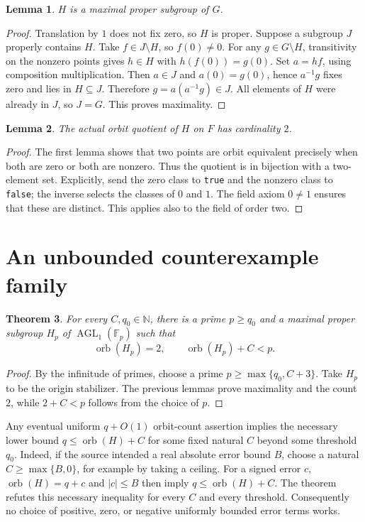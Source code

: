\documentclass[11pt]{article}
\newtheorem{theorem}{Theorem}
\newtheorem{lemma}[theorem]{Lemma}
\newcommand{\AGL}{\operatorname{AGL}}
\newcommand{\orb}{\operatorname{orb}}
\begin{document}
\begin{lemma}
$H$ is a maximal proper subgroup of $G$.
\end{lemma}
\begin{proof}
Translation by $1$ does not fix zero, so $H$ is proper. Suppose a subgroup
$J$ properly contains $H$. Take $f\in J\setminus H$, so $f(0)\ne0$. For any
$g\in G\setminus H$, transitivity on the nonzero points gives $h\in H$ with
$h(f(0))=g(0)$. Set $a=hf$, using composition multiplication. Then $a\in J$
and $a(0)=g(0)$, hence $a^{-1}g$ fixes zero and lies in $H\subseteq J$.
Therefore $g=a(a^{-1}g)\in J$. All elements of $H$ were already in $J$, so
$J=G$. This proves maximality.
\end{proof}

\begin{lemma}
The actual orbit quotient of $H$ on $F$ has cardinality $2$.
\end{lemma}
\begin{proof}
The first lemma shows that two points are orbit equivalent precisely when both
are zero or both are nonzero. Thus the quotient is in bijection with a two-element
set. Explicitly, send the zero class to \texttt{true} and the nonzero class to
\texttt{false}; the inverse selects the classes of $0$ and $1$. The field axiom
$0\ne1$ ensures that these are distinct. This applies also to the field of
order two.
\end{proof}

\section{An unbounded counterexample family}
\begin{theorem}
For every $C,q_0\in\mathbb N$, there is a prime $p\ge q_0$ and a maximal proper
subgroup $H_p$ of $\AGL_1(\mathbb F_p)$ such that
\[
\orb(H_p)=2,\qquad \orb(H_p)+C<p.
\]
\end{theorem}
\begin{proof}
By the infinitude of primes, choose a prime
$p\ge\max\{q_0,C+3\}$. Take $H_p$ to be the origin stabilizer. The previous
lemmas prove maximality and the count $2$, while $2+C<p$ follows from the choice
of $p$.
\end{proof}

Any eventual uniform $q+O(1)$ orbit-count assertion implies the necessary lower
bound $q\le\orb(H)+C$ for some fixed natural $C$ beyond some threshold $q_0$.
Indeed, if the source intended a real absolute error bound $B$, choose a natural
$C\ge\max\{B,0\}$, for example by taking a ceiling. For a signed error $c$,
$\orb(H)=q+c$ and $|c|\le B$ then imply $q\le\orb(H)+C$. The theorem refutes
this necessary inequality for every $C$ and every threshold. Consequently no
choice of positive, zero, or negative uniformly bounded error terms works.
\end{document}
